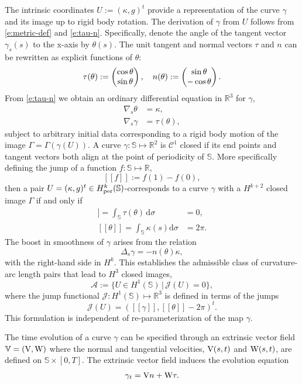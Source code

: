 \documentclass[11pt]{amsart}
\theoremstyle{plain}
\newcommand{\beq}{\begin{equation}}
\newcommand{\eeq}{\end{equation}}
\newcommand{\jmp}[1]{[\![#1]\!]}
\def\cA{{\mathcal A}}
\def\cC{{\mathcal C}}
\def\cJ{{\mathcal J}}
\def\mbbR{\mathbb{R}}
\def\mbbS{\mathbb{S}}
\def\mbbV{\mathbb{V}}
\def\mrV{\textrm V}
\def\mrW{\textrm W}
\def\vtau{\tau}
\def\rmd{\mathrm d}
\numberwithin{equation}{section}
\theoremstyle{plain}
\begin{document}
The intrinsic coordinates $U:=(\kappa,g)^t$ provide a representation of the curve $\gamma$ and its image up to rigid body rotation. The derivation of $\gamma$ from $U$ follows from \eqref{e:metric-def} and \eqref{e:tau-n}.
 Specifically, denote the angle of the tangent vector $\gamma_s(s)$ to the x-axis by $\theta(s)$. The unit tangent and normal vectors $\vtau$ and $n$ can be rewritten as explicit functions of $\theta$:
$$ \vtau(\theta):=\begin{pmatrix} \cos\theta\cr \sin \theta\end{pmatrix}, \quad n(\theta):=\begin{pmatrix} \sin\theta\cr -\cos \theta\end{pmatrix}.$$
 From \eqref{e:tau-n} we obtain an ordinary differential equation in $\mbbR^3$ for $\gamma$,
\beq\label{e:gamma-theta-kappa}
\begin{aligned}
 \nabla_s \theta&=\kappa,\\
 \nabla_s \gamma&=\tau(\theta),
 \end{aligned}
 \eeq
 subject to arbitrary initial data corresponding to a rigid body motion of the image $\Gamma=\Gamma(\gamma(U)).$
A curve $\gamma:\mbbS\mapsto \mbbR^2$ is $\cC^1$ closed if its end points and tangent vectors both align at the point of periodicity of $\mbbS$. More specifically defining the jump of a function $f:\mbbS\mapsto\mbbR,$
$$\jmp{f}:=f(1)-f(0),$$
then a pair $U=(\kappa,g)^t\in H_{\rm per}^k(\mbbS)$-corresponds to a curve $\gamma$ with a $H^{k+2}$ closed image $\Gamma$ if and only if
\begin{align}
  \jmp{\gamma}= \int_\mbbS \vtau(\theta)\,\rmd \sigma &=0, \label{e:C1}\\
  \jmp{\theta}=  \int_\mbbS \kappa(s)\rmd \sigma &=2\pi.\label{e:C2}
\end{align}
The boost in smoothness of $\gamma$ arises from the relation
$$ \Delta_s \gamma=-n(\theta)\kappa,$$
with the right-hand side in $H^k.$
This establishes the admissible class of curvature-arc length pairs that lead to $H^3$ closed images,
\beq \label{e:cA-def}
\cA:=\{U\in H^1(\mbbS)\, \bigl|\, \cJ(U)=0\},
\eeq
where the jump functional $\cJ:H^1(\mbbS)\mapsto \mbbR^3$ is defined in terms of the jumps 
\beq\label{e:cJ-def}
\cJ(U)=(\jmp{\gamma},\jmp{\theta}-2\pi)^t.
\eeq
This formulation  is independent of re-parameterization of the map $\gamma.$ 

The time evolution of a curve $\gamma$ can be specified through an extrinsic vector field
$\mbbV=(\mrV, \mrW)$ where
the normal and tangential velocities, $\mrV(s,t)$ and $\mrW(s,t)$, are
defined on $\mbbS\times[0,T]$.  The extrinsic vector field induces the evolution equation
\beq \label{e:gam-vel}
\gamma_t=\mrV n+\mrW \tau.
\eeq
\end{document}
